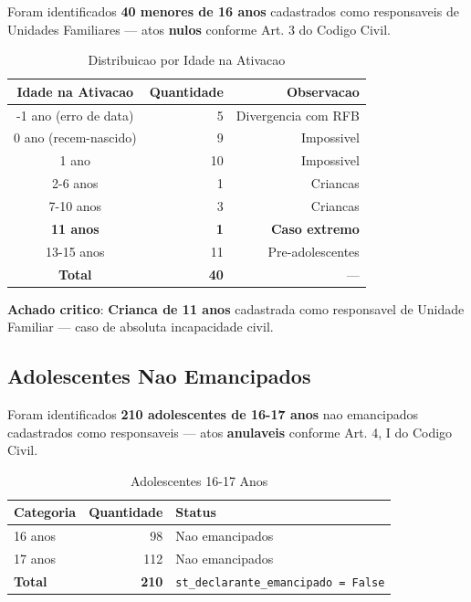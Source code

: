 \documentclass[11pt,a4paper]{article}
\begin{document}
Foram identificados \textbf{40 menores de 16 anos} cadastrados como responsaveis de
Unidades Familiares --- atos \textbf{nulos} conforme Art. 3\textordmasculine{} do Codigo Civil.

\begin{table}[H]
\centering
\caption{Distribuicao por Idade na Ativacao}
\label{tab:menores}
\begin{tabular}{crr}
\toprule
\textbf{Idade na Ativacao} & \textbf{Quantidade} & \textbf{Observacao} \\
\midrule
-1 ano (erro de data) & 5 & Divergencia com RFB \\
0 ano (recem-nascido) & 9 & Impossivel \\
1 ano & 10 & Impossivel \\
2-6 anos & 1 & Criancas \\
7-10 anos & 3 & Criancas \\
\textbf{11 anos} & \textbf{1} & \textbf{Caso extremo} \\
13-15 anos & 11 & Pre-adolescentes \\
\midrule
\textbf{Total} & \textbf{40} & --- \\
\bottomrule
\end{tabular}
\end{table}

\textbf{Achado critico}: \textbf{Crianca de 11 anos} cadastrada como responsavel de
Unidade Familiar --- caso de absoluta incapacidade civil.


\subsection{Adolescentes Nao Emancipados}

Foram identificados \textbf{210 adolescentes de 16-17 anos} nao emancipados cadastrados
como responsaveis --- atos \textbf{anulaveis} conforme Art. 4\textordmasculine{}, I do Codigo Civil.

\begin{table}[H]
\centering
\caption{Adolescentes 16-17 Anos}
\label{tab:adolescentes}
\begin{tabular}{lrl}
\toprule
\textbf{Categoria} & \textbf{Quantidade} & \textbf{Status} \\
\midrule
16 anos & 98 & Nao emancipados \\
17 anos & 112 & Nao emancipados \\
\midrule
\textbf{Total} & \textbf{210} & \texttt{st\_declarante\_emancipado = False} \\
\bottomrule
\end{tabular}
\end{table}
\end{document}
